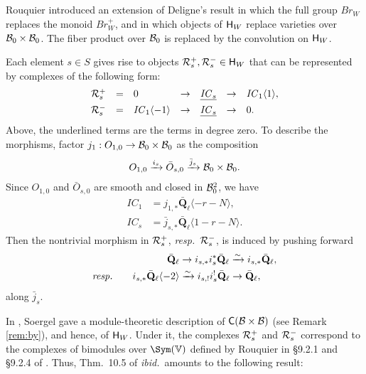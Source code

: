 \documentclass[a4paper,10pt,leqno]{amsart}
\theoremstyle{plain}
\theoremstyle{plain}
\theoremstyle{plain}
\theoremstyle{definition}
\theoremstyle{remark}
\newcommand{\Br}{\mathit{Br}}
\newcommand{\IC}{\mathit{IC}}
\newcommand{\QL}{\bar{\mathbf{Q}}_\ell}
\begin{document}
\subsection{}

Rouquier introduced an extension of Deligne's result in which the full group $\Br_W$ replaces the monoid $\Br_W^+$, and in which objects of $\sf{H}_W$ replace varieties over $\cal{B}_0 \times \cal{B}_0$.
The fiber product over $\cal{B}_0$ is replaced by the convolution on $\sf{H}_W$.

Each element $s \in S$ gives rise to objects $\cal{R}_s^+, \cal{R}_s^- \in \sf{H}_W$ that can be represented by complexes of the following form:
\begin{align}
\begin{array}{rcllllll}
\cal{R}_s^+ &= &0 &\to &\underline{{\IC_s}} &\to &\IC_1\langle 1\rangle,\\[1ex]
\cal{R}_s^- &= &\IC_1\langle -1\rangle &\to &\underline{{\IC_s}} &\to &0.
\end{array}
\end{align}
Above, the underlined terms are the terms in degree zero.
To describe the morphisms, factor $j_1 : O_{1, 0} \to \cal{B}_0 \times \cal{B}_0$ as the composition
\begin{align}
O_{1, 0} \xrightarrow{i_s} \bar{O}_{s, 0} \xrightarrow{\bar{j}_s} \cal{B}_0 \times \cal{B}_0.
\end{align}
Since $O_{1, 0}$ and $\bar{O}_{s, 0}$ are smooth and closed in $\cal{B}_0^2$, we have
\begin{align}
\IC_1 &= j_{1, \ast}\QL\langle -r - N\rangle,\\
\IC_s &= \bar{j}_{s, \ast}\QL \langle 1 - r - N\rangle.
\end{align}
Then the nontrivial morphism in $\cal{R}_s^+$, \emph{resp.}\ $\cal{R}_s^-$, is induced by pushing forward
\begin{align}
\QL
	&\to i_{s, \ast} i_s^\ast \QL
	\xrightarrow{\sim} i_{s, \ast} \QL,\\
\emph{resp.}\qquad
i_{s, \ast} \QL\langle -2\rangle 
	&\xrightarrow{\sim} i_{s,!} i_s^! \QL
	\to \QL,
\end{align}
along $\bar{j}_s$.

In \cite{soergel}, Soergel gave a module-theoretic description of $\sf{C}(\cal{B} \times \cal{B})$ (see Remark \ref{rem:by}), and hence, of $\sf{H}_W$.
Under it, the complexes $\cal{R}_s^+$ and $\cal{R}_s^-$ correspond to the complexes of bimodules over $\Sym(\bb{V})$ defined by Rouquier in \S{9.2.1} and \S{9.2.4} of \cite{rouquier_2006}.
Thus, Thm.\ 10.5 of \emph{ibid.}\ amounts to the following result:
\end{document}
